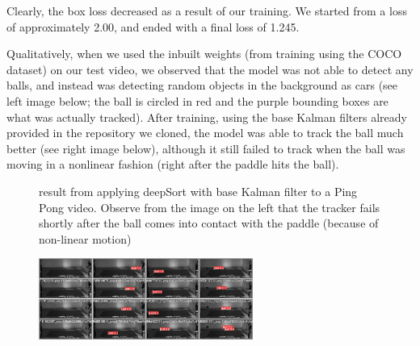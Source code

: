 \documentclass[10pt,twocolumn,letterpaper]{article}
\begin{document}
Clearly, the box loss decreased as a result of our training. We started from a loss of approximately 2.00, and ended with a final loss of 1.245. 

Qualitatively, when we used the inbuilt weights (from training using the COCO dataset) on our test video, we observed that the model was not able to detect any balls, and instead was detecting random objects in the background as cars (see left image below; the ball is circled in red and the purple bounding boxes are what was actually tracked). After training, using the base Kalman filters already provided in the repository we cloned, the model was able to track the ball much better (see right image below), although it still failed to track when the ball was moving in a nonlinear fashion (right after the paddle hits the ball).

\begin{figure}[h]
  \centering
    \qquad
    \caption{result from applying deepSort with base Kalman filter to a Ping Pong video. Observe from the image on the left that the tracker fails shortly after the ball comes into contact with the paddle (because of non-linear motion)}%
\end{figure}
\begin{figure}{
  \includegraphics[width=7cm]{validation.jpeg}}
\end{figure}
\end{document}
